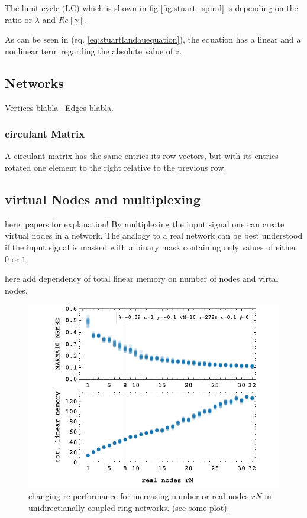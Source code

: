 The limit cycle (LC) which is shown in fig \ref{fig:stuart_spiral} is depending on the ratio or $\lambda$ and $Re \left[\gamma \right]$.





As can be seen in (eq. \ref{eq:stuartlandauequation}), the equation has a linear and a nonlinear term regarding the absolute value of $z$.

\subsection{Networks}

Vertices blabla \
Edges blabla. \

	\subsubsection{circulant Matrix}
    A circulant matrix has the same entries its row vectors, but with its entries rotated one element to the right relative to the previous row.
    
\subsection{virtual Nodes and multiplexing}
	here: papers for explanation!
	By multiplexing the input signal one can create virtual nodes in a network. The analogy to a real network can be best understood if the input signal is masked with a binary mask containing only values of either $0$ or $1$. 
	
	here add dependency of total linear memory on number of nodes and virtal nodes.
	
	\begin{figure}
		\centering
		\includegraphics[width=0.9\linewidth]{pics/rNplot}
		\caption{changing rc performance for increasing number or real nodes $rN$ in unidirectianally coupled ring networks. (see some plot).}
		\label{fig:rN_1-32}
	\end{figure}


